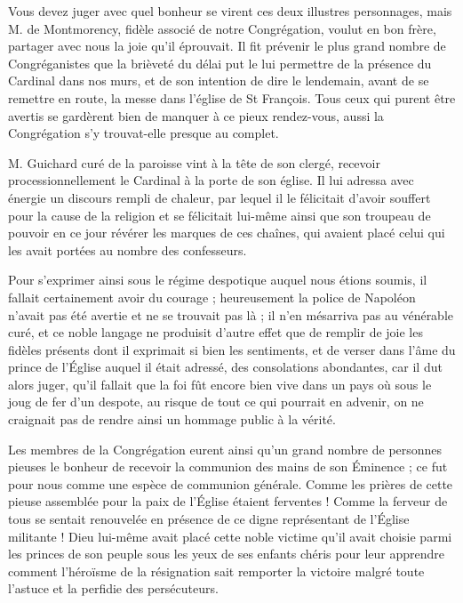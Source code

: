 Vous devez juger avec quel bonheur se virent ces deux illustres personnages, mais M. de Montmorency, fidèle associé de notre Congrégation, voulut en bon frère, partager avec nous la joie qu'il éprouvait. Il fit prévenir le plus grand nombre de Congréganistes que la brièveté du délai put le lui permettre de la présence du Cardinal dans nos murs, et de son intention de dire le lendemain, avant de se remettre en route, la messe dans l'église de St François. Tous ceux qui purent être avertis se gardèrent bien de manquer à ce pieux rendez-vous, aussi la Congrégation s'y trouvat-elle presque au complet.

M. Guichard curé de la paroisse vint à la tête de son clergé, recevoir processionnellement le Cardinal à la porte de son église. Il lui adressa avec énergie un discours rempli de chaleur, par lequel il le félicitait d'avoir souffert pour la cause de la religion et se félicitait lui-même ainsi que son troupeau de pouvoir en ce
jour révérer les marques de ces chaînes, qui avaient placé celui qui les avait portées au nombre des confesseurs.

Pour s'exprimer ainsi sous le régime despotique auquel nous étions soumis, il fallait certainement avoir du courage ; heureusement la police de Napoléon n'avait pas été avertie et ne se trouvait pas là ; il n'en mésarriva pas au vénérable curé, et ce noble langage ne produisit d'autre effet que de remplir de joie les fidèles présents dont il exprimait si bien les sentiments, et de verser dans l'âme du prince de l'Église auquel il était adressé, des consolations abondantes, car il dut alors juger, qu'il fallait que la foi fût encore bien vive dans un pays où sous le joug de fer d'un despote, au risque de tout ce qui pourrait en advenir, on ne craignait pas de rendre ainsi un hommage public à la vérité.

Les membres de la Congrégation eurent ainsi qu'un grand nombre de personnes pieuses le bonheur de recevoir la communion des mains de son Éminence ; ce fut pour nous comme une espèce de communion générale. Comme les prières de cette pieuse assemblée pour la paix de l'Église étaient ferventes ! Comme la ferveur de tous se sentait renouvelée en présence de ce digne représentant de l'Église militante ! Dieu lui-même avait placé cette noble victime qu'il avait choisie parmi les princes de son peuple sous les yeux de ses enfants chéris pour leur apprendre comment l'héroïsme de la résignation sait remporter la victoire malgré toute l'astuce et la perfidie des persécuteurs.

